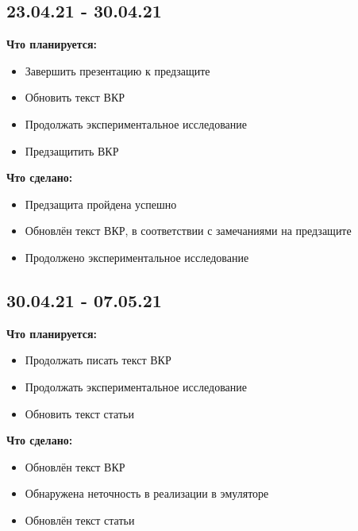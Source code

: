 \documentclass[a4peper, 12pt, titlepage, finall]{extreport}
\begin{document}
        \subsection{23.04.21 - 30.04.21}
            {\bf Что планируется:}
            \begin{itemize}
                \item Завершить презентацию к предзащите
                \item Обновить текст ВКР
                \item Продолжать экспериментальное исследование
                \item Предзащитить ВКР
            \end{itemize}
            {\bf Что сделано:}
            \begin{itemize}
                \item Предзащита пройдена успешно
                \item Обновлён текст ВКР, в соответствии с замечаниями на предзащите
                \item Продолжено экспериментальное исследование
            \end{itemize}
        \subsection{30.04.21 - 07.05.21}
            {\bf Что планируется:}
            \begin{itemize}
                \item Продолжать писать текст ВКР
                \item Продолжать экспериментальное исследование
                \item Обновить текст статьи
            \end{itemize}
            {\bf Что сделано:}
            \begin{itemize}
                \item Обновлён текст ВКР
                \item Обнаружена неточность в реализации в эмуляторе
                \item Обновлён текст статьи
            \end{itemize}
\end{document}
